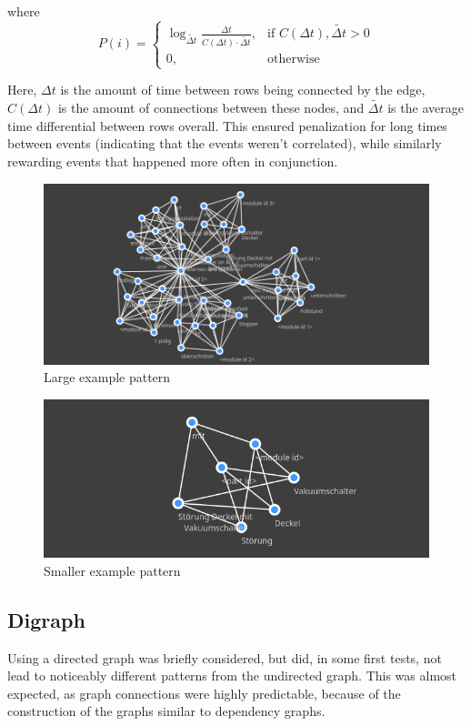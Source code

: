 \documentclass[pdftex,12pt,a4paper]{report}
\begin{document}
where
\[P(i) = \begin{cases}
	\log_{\tilde{\Delta t}} \frac{\Delta t}{C(\Delta t) \cdot \tilde{\Delta t}}, & \text{if }C(\Delta t), \tilde{\Delta t} > 0 \\
	0, & \text{otherwise}
\end{cases}\]

Here, $\Delta t$ is the amount of time between rows being connected by the edge, $C(\Delta t)$ is the amount of connections between these nodes, and $\tilde{\Delta t}$ is the average time differential between rows overall. This ensured penalization for long times between events (indicating that the events weren't correlated), while similarly rewarding events that happened more often in conjunction.

\begin{figure}
	\centering
	\noindent\includegraphics[width=\linewidth]{images/example_pattern}
	\caption{Large example pattern}
	\label{fig:example_patterns}
\end{figure}

\begin{figure}
	\centering
	\noindent\includegraphics[width=\linewidth]{images/small_pattern}
	\caption{Smaller example pattern}
	\label{fig:small_pattern}
\end{figure}

\subsection{Digraph}
Using a directed graph was briefly considered, but did, in some first tests, not lead to noticeably different patterns from the undirected graph. This was almost expected, as graph connections were highly predictable, because of the construction of the graphs similar to dependency graphs. 
\end{document}
